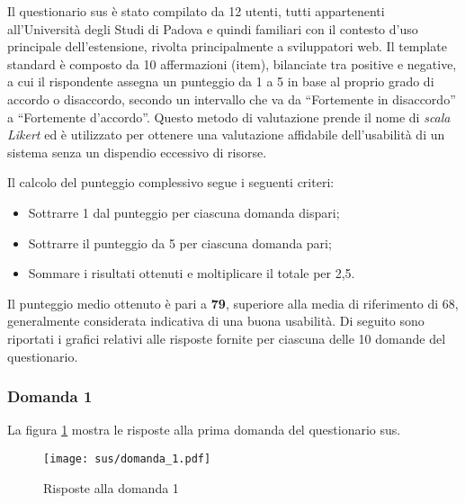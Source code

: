 \par Il questionario \gls{sus} è stato compilato da 12 utenti, tutti appartenenti all’Università degli Studi di Padova e quindi familiari con il contesto d’uso principale dell’estensione, rivolta principalmente a sviluppatori web. Il template standard è composto da 10 affermazioni (item), bilanciate tra positive e negative, a cui il rispondente assegna un punteggio da 1 a 5 in base al proprio grado di accordo o disaccordo, secondo un intervallo che va da “Fortemente in disaccordo” a “Fortemente d’accordo”. Questo metodo di valutazione prende il nome di \textit{scala Likert} ed è utilizzato per ottenere una valutazione affidabile dell’usabilità di un sistema senza un dispendio eccessivo di risorse.

\vspace{10pt}
\par\noindent Il calcolo del punteggio complessivo segue i seguenti criteri:
\begin{itemize}
  \item Sottrarre 1 dal punteggio per ciascuna domanda dispari;
  \item Sottrarre il punteggio da 5 per ciascuna domanda pari;
  \item Sommare i risultati ottenuti e moltiplicare il totale per 2,5. 
\end{itemize}

\vspace{5pt}
\par\noindent Il punteggio medio ottenuto è pari a \textbf{79}, superiore alla media di riferimento di 68, generalmente considerata indicativa di una buona usabilità. Di seguito sono riportati i grafici relativi alle risposte fornite per ciascuna delle 10 domande del questionario.

\subsubsection*{Domanda 1}

\vspace{5pt}
\begin{minipage}{\textwidth}
  \par\noindent La figura \ref{fig:sus_q1} mostra le risposte alla prima domanda del questionario \gls{sus}.
  \begin{figure}[H]
    \centering
    \texttt{[image: sus/domanda\_1.pdf]}
    \caption{Risposte alla domanda 1}
    \label{fig:sus_q1}
  \end{figure}
\end{minipage}

